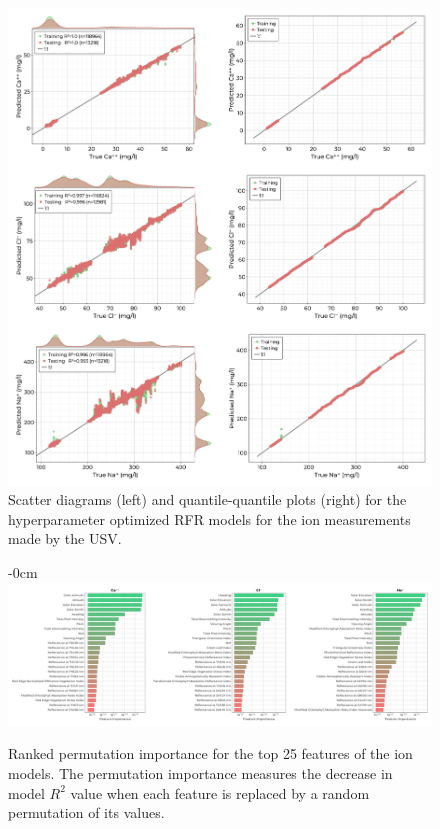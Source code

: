 \documentclass[remotesensing,article,submit,pdftex,moreauthors]{Definitions/mdpi}
\begin{document}
\begin{figure}
\centering
\includegraphics[width=\columnwidth]{paper/figures/results/fits/ions-fitres.png}
\caption{Scatter diagrams (left) and quantile-quantile plots (right) for the hyperparameter optimized RFR models for the ion measurements made by the USV.\label{fig:ions-fit}}
\end{figure}  

\begin{figure}
\begin{adjustwidth}{-\extralength}{0cm}
\centering
\includegraphics[width=18 cm]{paper/figures/results/fits/ions-ranking.pdf}
\end{adjustwidth}
\caption{Ranked permutation importance for the top 25 features of the ion models. The permutation importance measures the decrease in model $R^2$ value when each feature is replaced by a random permutation of its values.\label{fig:ions-fi}}
\end{figure}  
\end{document}
